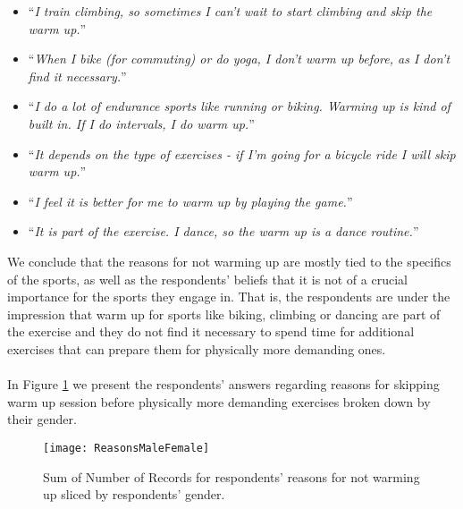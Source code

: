 \begin{itemize}
\item ``\textit{I train climbing, so sometimes I can't wait to start climbing and skip the warm up.}''
 \item ``\textit{When I bike (for commuting) or do yoga, I don't warm up before, as I don't find it necessary.}''
\item ``\textit{I do a lot of endurance sports like running or biking. Warming up is kind of built in. If I do intervals, I do warm up.}''
\item ``\textit{It depends on the type of exercises - if I'm going for a bicycle ride I will skip warm up.}''
\item ``\textit{I feel it is better for me to warm up by playing the game.}''
\item ``\textit{It is part of the exercise. I dance, so the warm up is a dance routine.}''
\end{itemize}
We conclude that the reasons for not warming up are mostly tied to the specifics of the sports, as well as the respondents' beliefs that it is not of a crucial importance for the sports they engage in. That is, the respondents are under the impression that warm up for sports like biking, climbing or dancing are part of the exercise and they do not find it necessary to spend time for additional exercises that can prepare them for physically more demanding ones.\\ \\
In Figure \ref{fig:ReasonsMaleFemale} we present the respondents' answers regarding reasons for skipping warm up session before physically more demanding exercises broken down by their gender.\\
\begin{figure}[h]
    \centering
    \texttt{[image: ReasonsMaleFemale]}
    \caption{Sum of Number of Records for respondents' reasons for not warming up sliced by respondents' gender.}
    \label{fig:ReasonsMaleFemale}
\end{figure}\\
